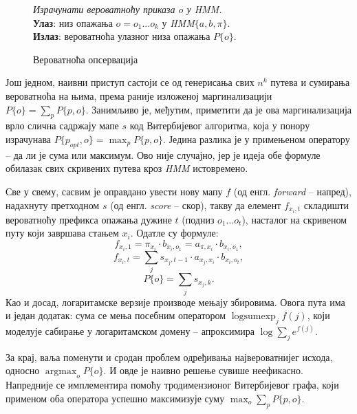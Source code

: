 \documentclass[12pt,oneside]{memoir}
\newenvironment{problem}[1][!ht]
{\renewcommand{\algorithmcfname}{Проблем}
\begin{figure}[!ht]
\centering
  \begin{minipage}{.94\linewidth}
	\begin{algorithm}[#1]%
  }{\end{algorithm}
  \end{minipage}
\end{figure}}
\begin{document}
\begin{CJK}{UTF8}{ipxm}
\begin{problem}[H]
  \SetAlgoLined
  \textit{Израчунати вероватноћу приказа $o$ у \textit{HMM}.}\\
  \textbf{Улаз}: низ опажања $o = o_1...o_k$ у \textit{HMM}$\{a, b, \pi\}$.\\
  \textbf{Излаз}: вероватноћа улазног низа опажања $P\{o\}$.
  \caption{Вероватноћа опсервација\cite{ba10d}}
  \label{prob:ops}
\end{problem}

Још једном, наивни приступ састоји се од генерисања свих $n^k$ путева и сумирања вероватноћа на њима, према раније изложеној маргинализацији $P\{o\} = \sum_p P\{p, o\}$. Занимљиво је, међутим, приметити да је ова маргинализација врло слична садржају мапе $s$ код Витербијевог алгоритма, која у понору израчунава $P\{p_{opt}, o\} = \max_p P\{p, o\}$. Једина разлика је у примењеном оператору -- да ли је сума или максимум. Ово није случајно, јер је идеја обе формуле обилазак свих скривених путева кроз \textit{HMM} истовремено.

Све у свему, сасвим је оправдано увести нову мапу $f$ (од енгл. \textit{forward} -- напред), надахнуту претходном $s$ (од енгл. \textit{score} -- скор), такву да елемент $f_{x_i, t}$ складишти вероватноћу префикса опажања дужине $t$ (подниз $o_1...o_t$), насталог на скривеном путу који завршава стањем $x_i$. Одатле су формуле: $$f_{x_i, 1} = \pi_{x_i} \cdot b_{x_i, o_1} = a_{\pi, x_i} \cdot b_{x_i, o_1},$$ $$f_{x_i, t} = \sum_j s_{x_j, t-1} \cdot a_{x_j, x_i} \cdot b_{x_i, o_t},$$ $$P\{o\} = \sum_j s_{x_j, k}.$$ Као и досад, логаритамске верзије производе мењају збировима. Овога пута има и један додатак: сума се мења посебним оператором $\operatorname{logsumexp}_j f(j)$, који моделује сабирање у логаритамском домену -- апроксимира $\log \sum_j e^{f(j)}$.

За крај, ваља поменути и сродан проблем одређивања највероватнијег исхода, односно $\operatorname{argmax}_o P\{o\}$. И овде је наивно решење сувише неефикасно. Напредније се имплементира помоћу тродимензионог Витербијевог графа, који применом оба оператора успешно максимизује суму $\max_o \sum_p P\{p, o\}$.


\end{CJK}
\end{document}
